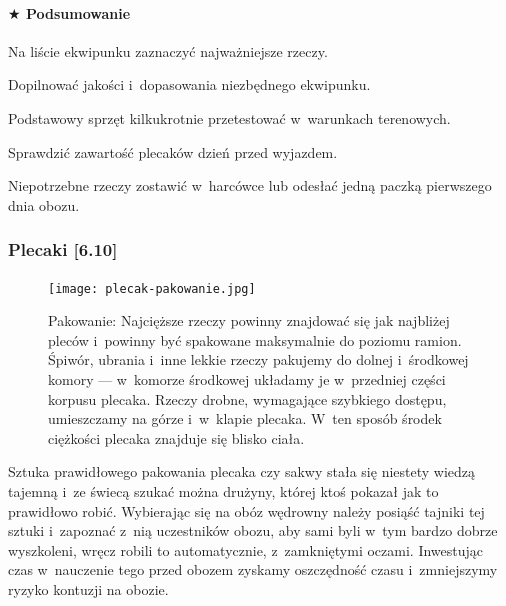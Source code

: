 \documentclass[a5paper,10pt,titlepage,twoside]{article}
\newcommand*{\thecheckbox}{\hss$\Box$} %
\newenvironment*{checklist}
{\list{}{%
\renewcommand*{\makelabel}[1]{\thecheckbox}}}
{\endlist}
\begin{document}
\paragraph{$\bigstar$ Podsumowanie}
\begin{checklist}
\item Na liście ekwipunku zaznaczyć najważniejsze rzeczy.
\item Dopilnować jakości i~dopasowania niezbędnego ekwipunku.
\item Podstawowy sprzęt kilkukrotnie przetestować w~warunkach terenowych.
\item Sprawdzić zawartość plecaków dzień przed wyjazdem.
\item Niepotrzebne rzeczy zostawić w~harcówce lub odesłać jedną paczką pierwszego dnia obozu.
\end{checklist}

\subsubsection{Plecaki [6.10]}
\begin{figure}[htp]
\centering
\texttt{[image: plecak-pakowanie.jpg]}
\caption[Caxton for LOK]{Pakowanie: Najcięższe rzeczy powinny znajdować się jak najbliżej pleców i~powinny być spakowane maksymalnie do poziomu ramion. Śpiwór, ubrania i~inne lekkie rzeczy pakujemy do dolnej i~środkowej komory --- w~komorze środkowej układamy je w~przedniej części korpusu plecaka. Rzeczy drobne, wymagające szybkiego dostępu, umieszczamy na górze i~w~klapie plecaka. W~ten sposób środek ciężkości plecaka znajduje się blisko ciała.\footnotemark}
\label{fig:pakowanie}
\end{figure}
Sztuka prawidłowego pakowania plecaka czy sakwy stała się niestety wiedzą tajemną i~ze świecą szukać można drużyny, której ktoś pokazał jak to prawidłowo robić. Wybierając się na obóz wędrowny należy posiąść tajniki tej sztuki i~zapoznać z~nią uczestników obozu, aby sami byli w~tym bardzo dobrze wyszkoleni, wręcz robili to automatycznie, z~zamkniętymi oczami. Inwestując czas w~nauczenie tego przed obozem zyskamy oszczędność czasu i~zmniejszymy ryzyko kontuzji na obozie.
\end{document}
